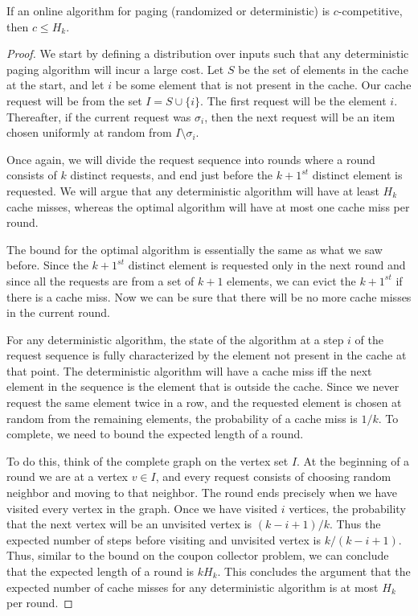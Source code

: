 \begin{theorem}
	If an online algorithm for paging (randomized or deterministic) is $c$-competitive, then $c \leq H_k$.
	\label{thm:lb-pagin}
\end{theorem}
\begin{proof}
	We start by defining a distribution over inputs such that any deterministic paging algorithm will incur a large cost. Let $S$ be the set of elements in the cache at the start, and let $i$ be some element that is not present in the cache. Our cache request will be from the set $I = S \cup \{i\}$. The first request will be the element $i$. Thereafter, if the current request was $\sigma_i$, then the next request will be an item chosen uniformly at random from $I \setminus \sigma_i$. 
	
	Once again, we will divide the request sequence into rounds where a round consists of $k$ distinct requests, and end just before the $k+1^{st}$ distinct element is requested. We will argue that any deterministic algorithm will have at least $H_k$ cache misses, whereas the optimal algorithm will have at most one cache miss per round. 
	
	The bound for the optimal algorithm is essentially the same as what we saw before. Since the $k+1^{st}$ distinct element is requested only in the next round and since all the requests are from a set of $k+1$ elements, we can evict the $k+1^{st}$ if there is a cache miss. Now we can be sure that there will be no more cache misses in the current round.
	
	For any deterministic algorithm, the state of the algorithm at a step $i$ of the request sequence is fully characterized by the element not present in the cache at that point. The deterministic algorithm will have a cache miss iff the next element in the sequence is the element that is outside the cache. Since we never request the same element twice in a row, and the requested element is chosen at random from the remaining elements, the probability of a cache miss is $1/k$. To complete, we need to bound the expected length of a round.
	
	To do this, think of the complete graph on the vertex set $I$. At the beginning of a round we are at a vertex $v \in I$, and every request consists of choosing random neighbor and moving to that neighbor. The round ends precisely when we have visited every vertex in the graph. Once we have visited $i$ vertices, the probability that the next vertex will be an unvisited vertex is $(k-i+1)/k$. Thus the expected number of steps before visiting and unvisited vertex is $k/(k-i+1)$. Thus, similar to the bound on the coupon collector problem, we can conclude that the expected length of a round is $kH_k$. This concludes the argument that the expected number of cache misses for any deterministic algorithm is at most $H_k$ per round.
\end{proof}

